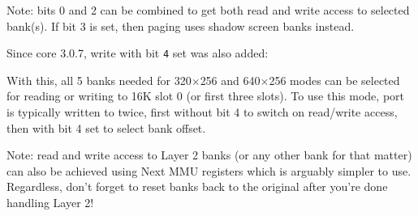 \begin{NextPort}
\end{NextPort}

Note: bits 0 and 2 can be combined to get both read and write access to selected bank(s). If bit 3 is set, then paging uses shadow screen banks instead.

Since core 3.0.7, write with bit {\tt 4} set was also added:

\begin{NextPort}
\end{NextPort}

With this, all 5 banks needed for 320$\times$256 and 640$\times$256 modes can be selected for reading or writing to 16K slot 0 (or first three slots). To use this mode, port  is typically written to twice, first without bit 4 to switch on read/write access, then with bit 4 set to select bank offset.

Note: read and write access to Layer 2 banks (or any other bank for that matter) can also be achieved using Next MMU registers which is arguably simpler to use. Regardless, don't forget to reset banks back to the original after you're done handling Layer 2!


